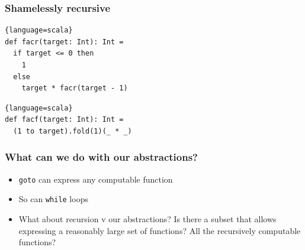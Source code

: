 \documentclass[
  aspectratio=1610, 
  xcolor={dvipsnames},
]{beamer}
\begin{document}
\begin{frame}[fragile]
  \frametitle{Shamelessly recursive}

  \begin{lstlisting}{language=scala}
def facr(target: Int): Int = 
  if target <= 0 then 
    1 
  else 
    target * facr(target - 1)
\end{lstlisting}


  \pause

\begin{lstlisting}{language=scala}
def facf(target: Int): Int = 
  (1 to target).fold(1)(_ * _)
\end{lstlisting}

\end{frame}


\begin{frame}
  \frametitle{What can we do with our abstractions?}

  \begin{itemize}[<+->]
    \item \lstinline|goto| can express any computable function
    \item So can \lstinline|while| loops
    \item What about recursion v our abstractions? Is there a subset that allows
    expressing a reasonably large set of functions? All the recursively
    computable functions?
  \end{itemize}


\end{frame}
\end{document}
